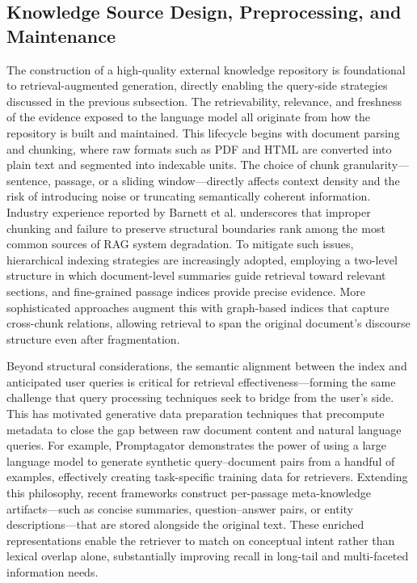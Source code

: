 \documentclass[11pt,a4paper]{article}
\begin{document}
\subsection{Knowledge Source Design, Preprocessing, and Maintenance}


The construction of a high-quality external knowledge repository is foundational to retrieval-augmented generation, directly enabling the query-side strategies discussed in the previous subsection. The retrievability, relevance, and freshness of the evidence exposed to the language model all originate from how the repository is built and maintained. This lifecycle begins with document parsing and chunking, where raw formats such as PDF and HTML are converted into plain text and segmented into indexable units. The choice of chunk granularity---sentence, passage, or a sliding window---directly affects context density and the risk of introducing noise or truncating semantically coherent information. Industry experience reported by Barnett et al. \cite{arxiv:2401.05856v1} underscores that improper chunking and failure to preserve structural boundaries rank among the most common sources of RAG system degradation. To mitigate such issues, hierarchical indexing strategies are increasingly adopted, employing a two-level structure in which document-level summaries guide retrieval toward relevant sections, and fine-grained passage indices provide precise evidence. More sophisticated approaches augment this with graph-based indices that capture cross-chunk relations, allowing retrieval to span the original document's discourse structure even after fragmentation.

Beyond structural considerations, the semantic alignment between the index and anticipated user queries is critical for retrieval effectiveness---forming the same challenge that query processing techniques seek to bridge from the user's side. This has motivated generative data preparation techniques that precompute metadata to close the gap between raw document content and natural language queries. For example, Promptagator \cite{arxiv:2209.11755v1} demonstrates the power of using a large language model to generate synthetic query--document pairs from a handful of examples, effectively creating task-specific training data for retrievers. Extending this philosophy, recent frameworks construct per-passage meta-knowledge artifacts---such as concise summaries, question--answer pairs, or entity descriptions---that are stored alongside the original text. These enriched representations enable the retriever to match on conceptual intent rather than lexical overlap alone, substantially improving recall in long-tail and multi-faceted information needs.
\end{document}

